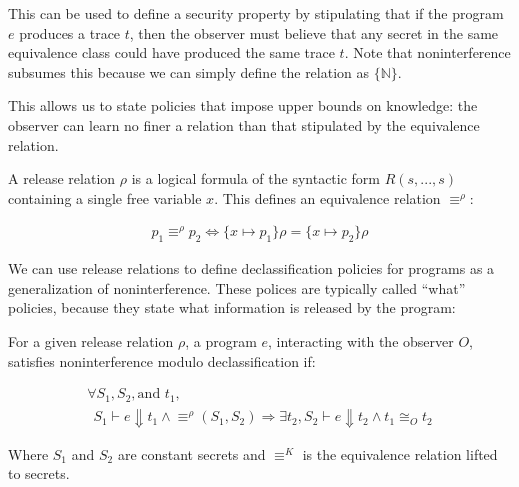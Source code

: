 \documentclass[conference]{IEEEtran}
\theoremstyle{definition}
\newcommand{\aset}[1]{\{#1\}}
\newcommand{\prin}{\textit{O}}
\newcommand{\tr}{t\xspace}
\begin{document}
This can be used to define a security property by stipulating that if
the program $e$ produces a trace $\tr$, then the observer must believe
that any secret in the same equivalence class could have produced the
same trace $\tr$.  Note that noninterference subsumes this because we
can simply define the relation as $\{ \mathbb{N} \}$.

This allows us to state policies that impose upper bounds on
knowledge: the observer can learn no finer a relation than that
stipulated by the equivalence relation.

\begin{Definition}
  A release relation $\rho$ is a logical formula of the syntactic form
  $R(s, ..., s)$ containing a single free variable $x$. This defines
  an equivalence relation $\equiv^\rho$:
  
  \begin{displaymath}
    \begin{array}{c}
      p_1 \equiv^\rho p_2 \iff \aset{x\mapsto p_1}\rho =
      \aset{x\mapsto p_2}\rho
    \end{array}
  \end{displaymath}
\end{Definition}

We can use release relations to define declassification policies for
programs as a generalization of noninterference.  These polices are
typically called ``what'' policies, because they state what
information is released by the program:

\begin{Definition}
  For a given release relation $\rho$, a program $e$, interacting with
  the observer $\prin$, satisfies noninterference modulo
  declassification if:

  \begin{displaymath}
    \begin{array}{l}
      \forall S_1, S_2, \text{and~} \tr_1, \\
      ~~ S_1 \vdash e \Downarrow \tr_1 \land \equiv^\rho(S_1,S_2) \Rightarrow \exists \tr_2, S_2
      \vdash e \Downarrow \tr_2
      \land \tr_1 \cong_{\prin} \tr_2
    \end{array}
  \end{displaymath}
  
  Where $S_1$ and $S_2$ are constant secrets and $\equiv^K$ is the
  equivalence relation lifted to secrets.
\end{Definition}
\end{document}
